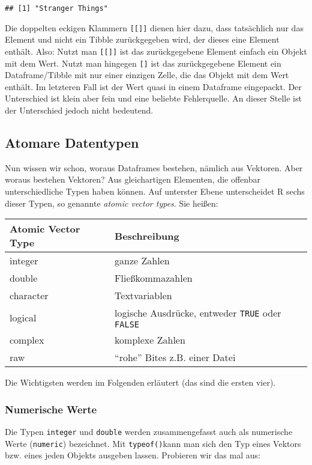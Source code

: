\documentclass[
]{book}
\begin{document}
\begin{verbatim}
## [1] "Stranger Things"
\end{verbatim}

Die doppelten eckigen Klammern \texttt{{[}{[}{]}{]}} dienen hier dazu, dass tatsächlich nur das Element und nicht ein Tibble zurückgegeben wird, der dieses eine Element enthält. Also: Nutzt man \texttt{{[}{[}{]}{]}} ist das zurückgegebene Element einfach ein Objekt mit dem Wert. Nutzt man hingegen \texttt{{[}{]}} ist das zurückgegebene Element ein Dataframe/Tibble mit nur einer einzigen Zelle, die das Objekt mit dem Wert enthält. Im letzteren Fall ist der Wert quasi in einem Dataframe eingepackt. Der Unterschied ist klein aber fein und eine beliebte Fehlerquelle. An dieser Stelle ist der Unterschied jedoch nicht bedeutend.

\hypertarget{atomic_vector_types}{%
\subsection{Atomare Datentypen}\label{atomic_vector_types}}

Nun wissen wir schon, woraus Dataframes bestehen, nämlich aus Vektoren. Aber woraus bestehen Vektoren? Aus gleichartigen Elementen, die offenbar unterschiedliche Typen haben können. Auf unterster Ebene unterscheidet R sechs dieser Typen, so genannte \emph{atomic vector types}. Sie heißen:

\begin{longtable}[]{@{}ll@{}}
\toprule
Atomic Vector Type & Beschreibung\tabularnewline
\midrule
\endhead
integer & ganze Zahlen\tabularnewline
double & Fließkommazahlen\tabularnewline
character & Textvariablen\tabularnewline
logical & logische Ausdrücke, entweder \texttt{TRUE} oder \texttt{FALSE}\tabularnewline
complex & komplexe Zahlen\tabularnewline
raw & ``rohe'' Bites z.B. einer Datei\tabularnewline
\bottomrule
\end{longtable}

Die Wichtigsten werden im Folgenden erläutert (das sind die ersten vier).

\hypertarget{numerische-werte}{%
\subsubsection{Numerische Werte}\label{numerische-werte}}

Die Typen \texttt{integer} und \texttt{double} werden zusammengefasst auch als numerische Werte (\texttt{numeric}) bezeichnet. Mit \texttt{typeof()}kann man sich den Typ eines Vektors bzw. eines jeden Objekts ausgeben lassen. Probieren wir das mal aus:
\end{document}
